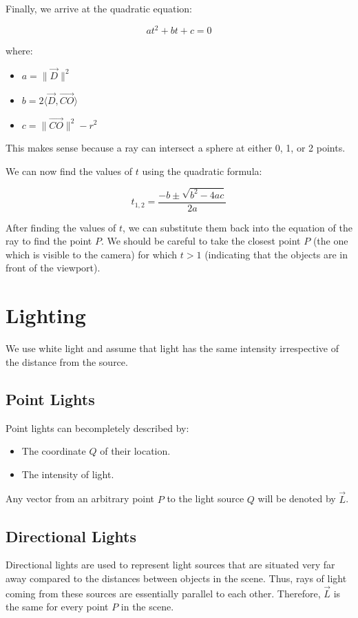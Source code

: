 \documentclass{article}
\begin{document}
Finally, we arrive at the quadratic equation:

$$at^2 + bt + c = 0$$

where:
\begin{itemize}
    \item $a = \| \vec{D} \|^2$
    \item $b = 2 \langle \vec{D}, \vec{CO} \rangle$
    \item $c = \| \vec{CO} \|^2 - r^2$
\end{itemize}

This makes sense because a ray can intersect a sphere at either 0, 1, or 2 points.

We can now find the values of $t$ using the quadratic formula:

$$t_{1,2} = \frac{-b \pm \sqrt{b^2 - 4ac}}{2a}$$

After finding the values of $t$, we can substitute them back into the equation of the ray to find the point $P$. We should be careful to take the closest point $P$ (the one which is visible to the camera) for which $t > 1$ (indicating that the objects are in front of the viewport).

\section{Lighting}

We use white light and assume that light has the same intensity irrespective of the distance from the source.

\subsection{Point Lights}

Point lights can becompletely described by:
\begin{itemize}
    \item The coordinate $Q$ of their location.
    \item The intensity of light.
\end{itemize}

Any vector from an arbitrary point $P$ to the light source $Q$ will be denoted by $\vec{L}$.

\subsection{Directional Lights}

Directional lights are used to represent light sources that are situated very far away compared to the distances between objects in the scene. Thus, rays of light coming from these sources are essentially parallel to each other. Therefore, $\vec{L}$ is the same for every point $P$ in the scene.
\end{document}
